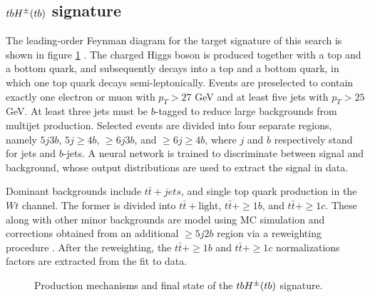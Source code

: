 \subsection{\texorpdfstring{$tbH^{\pm}(tb)$}{TEXT} signature}
\label{subsect:tbHtb}
The leading-order Feynman diagram for the target signature of this search is shown in figure \ref{fig:tbHtb-signature} \cite{HDBS-2018-51}. The charged Higgs boson is produced together with a top and a bottom quark, and subsequently decays into a top and a bottom quark, in which one top quark decays semi-leptonically. Events are preselected to contain exactly one electron or muon with $p_T>27$ GeV and at least five jets with $p_T>25$ GeV. At least three jets must be $b$-tagged to reduce large backgrounds from multijet production. Selected events are divided into four separate regions, namely $5j3b$, $5j\ge 4b$, $\ge 6j3b$, and $\ge 6j\ge 4b$, where $j$ and $b$ respectively stand for jets and $b$-jets. A neural network is trained to discriminate between signal and background, whose output distributions are used to extract the signal in data. 

Dominant backgrounds include $t\bar{t}+jets$, and single top quark production in the $Wt$ channel. The former is divided into $t\bar{t}+\mathrm{light}$, $t\bar{t}+\ge 1b$, and $t\bar{t}+\ge 1c$. These along with other minor backgrounds are model using MC simulation and corrections obtained from an additional $\ge 5j2b$ region via a reweighting procedure \cite{ATL-PHYS-PUB-2018-009, TOPQ-2018-18}. After the reweighting, the $t\bar{t}+\ge 1b$ and $t\bar{t}+ \ge 1c$ normalizations factors are extracted from the fit to data. 

\begin{figure}[h!]
    \centering
    \begin{subfigure}[3]{0.48\textwidth}
        \centering
    \end{subfigure}
    \caption{Production mechanisms and final state of the $tbH^{\pm}(tb)$ signature.}
    \label{fig:tbHtb-signature}
\end{figure} 

